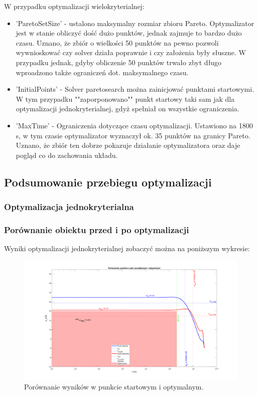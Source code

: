 \documentclass{article}
\begin{document}
W przypadku optymalizacji wielokryterialnej:
\begin{itemize}
    \item 'ParetoSetSize' - ustalono maksymalny rozmiar zbioru Pareto. Optymalizator jest w stanie obliczyć dość dużo punktów, jednak zajmuje to bardzo dużo czasu. Uznano, że zbiór o wielkości 50 punktów na pewno pozwoli
          wywnioskować czy solver działa poprawnie i czy założenia były słuszne. W przypadku jednak, gdyby obliczenie 50 punktów trwało zbyt długo wproadzono także ograniczeń dot. maksymalnego czasu.
    \item 'InitialPoints' - Solver paretosearch można zainicjować punktami startowymi. W tym przypadku ""zaporponowano"" punkt startowy taki sam jak dla optymalizacji jednokryterialnej, gdyż spełniał on wszystkie ograniczenia.
    \item 'MaxTime' - Ograniczenia dotyczące czasu optymalizacji. Ustawiono na 1800 s, w tym czasie optymalizator wyznaczył ok. 35 punktów na granicy Pareto. Uznano, że zbiór ten dobrze pokazuje działanie optymalizatora oraz daje pogląd co do zachowania układu.
\end{itemize}

\pagebreak
\subsection{Podsumowanie przebiegu optymalizacji}
\subsubsection{Optymalizacja jednokryterialna}
\subsubsection*{Porównanie obiektu przed i po optymalizacji}
Wyniki optymalizacji jednokryterialnej zobaczyć można na poniższym wykresie:
\begin{figure}[h]
    \includegraphics[width=12cm]{graphics/comparison.png}
    \centering
    \caption{Porównanie wyników w punkcie startowym i optymalnym.}
\end{figure}
\end{document}
